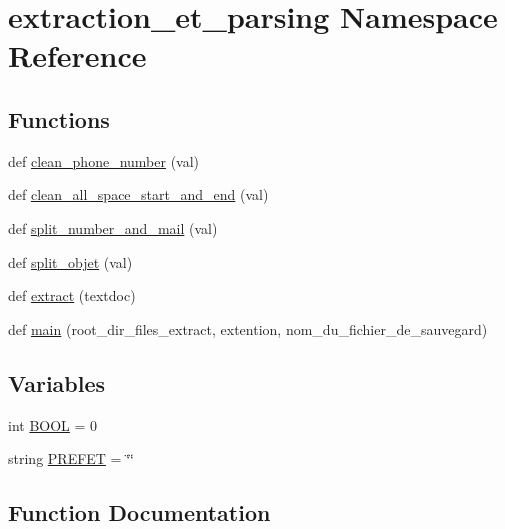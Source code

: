 \hypertarget{namespaceextraction__et__parsing}{}\section{extraction\+\_\+et\+\_\+parsing Namespace Reference}
\label{namespaceextraction__et__parsing}
\subsection*{Functions}
\begin{DoxyCompactItemize}
\item 
def \hyperlink{namespaceextraction__et__parsing_a7455f32611bca76b435ba91900a42fbd}{clean\+\_\+phone\+\_\+number} (val)
\item 
def \hyperlink{namespaceextraction__et__parsing_aa99d145f727a85b0a84f3661d6cf9314}{clean\+\_\+all\+\_\+space\+\_\+start\+\_\+and\+\_\+end} (val)
\item 
def \hyperlink{namespaceextraction__et__parsing_a52f90c42ce48a5e54f7f19ae00555516}{split\+\_\+number\+\_\+and\+\_\+mail} (val)
\item 
def \hyperlink{namespaceextraction__et__parsing_a392c9c5eea6df0625ce4eddac09965a5}{split\+\_\+objet} (val)
\item 
def \hyperlink{namespaceextraction__et__parsing_ac16cd0fc2f8bf7c62a58cc89b5c5c90d}{extract} (textdoc)
\item 
def \hyperlink{namespaceextraction__et__parsing_afa9eada7d7cd816ee7d84d53e1a9508e}{main} (root\+\_\+dir\+\_\+files\+\_\+extract, extention, nom\+\_\+du\+\_\+fichier\+\_\+de\+\_\+sauvegard)
\end{DoxyCompactItemize}
\subsection*{Variables}
\begin{DoxyCompactItemize}
\item 
int \hyperlink{namespaceextraction__et__parsing_a01c691f145a3998d68408fcc77146208}{B\+O\+OL} = 0
\item 
string \hyperlink{namespaceextraction__et__parsing_a3104f9b927055b52b20e0bedac145174}{P\+R\+E\+F\+ET} = \char`\"{}\char`\"{}
\end{DoxyCompactItemize}


\subsection{Function Documentation}
\mbox{\label{namespaceextraction__et__parsing_aa99d145f727a85b0a84f3661d6cf9314}} 
